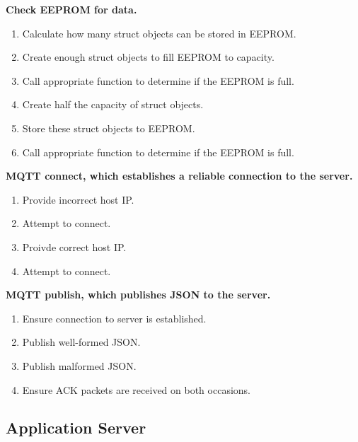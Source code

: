 \documentclass[a4paper,10pt]{article}
\begin{document}
		\textbf{Check EEPROM for data.}
		\begin{enumerate}
			\item Calculate how many struct objects can be stored in EEPROM.
			\item Create enough struct objects to fill EEPROM to capacity.
			\item Call appropriate function to determine if the EEPROM is full.
			\item Create half the capacity of struct objects.
			\item Store these struct objects to EEPROM.
			\item Call appropriate function to determine if the EEPROM is full.
		\end{enumerate}
		\textbf{MQTT connect, which establishes a reliable connection to the server.}
		\begin{enumerate}
			\item Provide incorrect host IP.
			\item Attempt to connect.
			\item Proivde correct host IP.
			\item Attempt to connect.
		\end{enumerate}
		\textbf{MQTT publish, which publishes JSON to the server.}
		\begin{enumerate}
			\item Ensure connection to server is established.
			\item Publish well-formed JSON.
			\item Publish malformed JSON.
			\item Ensure ACK packets are received on both occasions.
		\end{enumerate}
		
		\subsection{Application Server}
		
\end{document}
